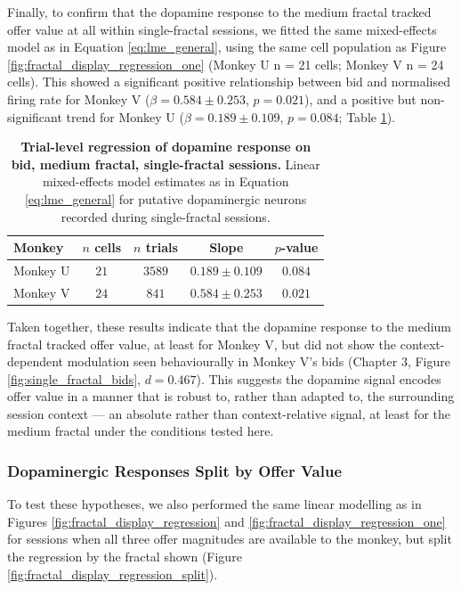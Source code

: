 Finally, to confirm that the dopamine response to the medium fractal tracked offer value at all within single-fractal sessions, we fitted the same mixed-effects model as in Equation \ref{eq:lme_general}, using the same cell population as Figure \ref{fig:fractal_display_regression_one} (Monkey U n = 21 cells; Monkey V n = 24 cells). This showed a significant positive relationship between bid and normalised firing rate for Monkey V ($\beta = 0.584 \pm 0.253$, $p = 0.021$), and a positive but non-significant trend for Monkey U ($\beta = 0.189 \pm 0.109$, $p = 0.084$; Table \ref{tab:medium_fractal_regression}).

\begin{table}[htbp]
\centering
\begin{tabular}{lcccc}
\hline
\textbf{Monkey} & \textbf{$n$ cells} & \textbf{$n$ trials} & \textbf{Slope} & \textbf{$p$-value} \\
\hline
Monkey U & $21$ & $3589$ & $0.189 \pm 0.109$ & $0.084$ \\
Monkey V & $24$ & $841$ & $0.584 \pm 0.253$ & $0.021$ \\
\hline
\end{tabular}
\caption[Trial-level regression of dopamine response on bid, medium fractal, single-fractal sessions.]{\textbf{Trial-level regression of dopamine response on bid, medium fractal, single-fractal sessions.} Linear mixed-effects model estimates as in Equation \ref{eq:lme_general} for putative dopaminergic neurons recorded during single-fractal sessions.}
\label{tab:medium_fractal_regression}
\end{table}

Taken together, these results indicate that the dopamine response to the medium fractal tracked offer value, at least for Monkey V, but did not show the context-dependent modulation seen behaviourally in Monkey V's bids (Chapter 3, Figure \ref{fig:single_fractal_bids}, $d = 0.467$). This suggests the dopamine signal encodes offer value in a manner that is robust to, rather than adapted to, the surrounding session context — an absolute rather than context-relative signal, at least for the medium fractal under the conditions tested here.

\subsubsection{Dopaminergic Responses Split by Offer Value}

To test these hypotheses, we also performed the same linear modelling as in Figures \ref{fig:fractal_display_regression} and \ref{fig:fractal_display_regression_one} for sessions when all three offer magnitudes are available to the monkey, but split the regression by the fractal shown (Figure \ref{fig:fractal_display_regression_split}). 


